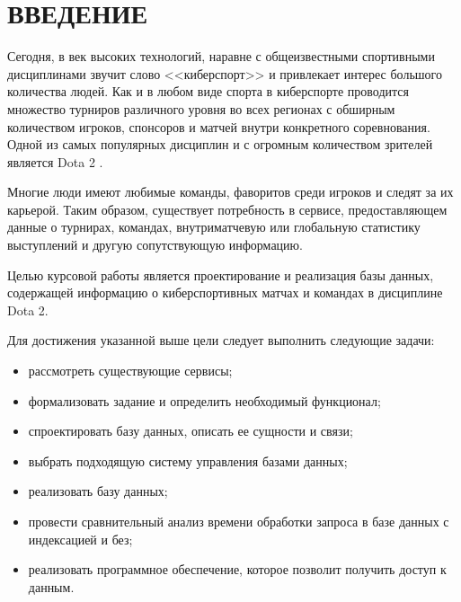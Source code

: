 \chapter*{ВВЕДЕНИЕ}

Сегодня, в век высоких технологий, наравне с общеизвестными спортивными дисциплинами звучит слово <<киберспорт>> и привлекает интерес большого количества людей. Как и в любом виде спорта в киберспорте проводится множество турниров различного уровня во всех регионах с обширным количеством игроков, спонсоров и матчей внутри конкретного соревнования. Одной из самых популярных дисциплин и с огромным количеством зрителей является Dota 2 \cite{twitchtracker}.

Многие люди имеют любимые команды, фаворитов среди игроков и следят за их карьерой. Таким образом, существует потребность в сервисе, предоставляющем данные о турнирах, командах, внутриматчевую или глобальную статистику выступлений и другую сопутствующую информацию.

Целью курсовой работы является проектирование и реализация базы данных, содержащей информацию о киберспортивных матчах и командах в дисциплине Dota 2.

Для достижения указанной выше цели следует выполнить следующие задачи:
	\begin{itemize}
		\item рассмотреть существующие сервисы;
		\item формализовать задание и определить необходимый функционал;
  	\item спроектировать базу данных, описать ее сущности и связи;
		\item выбрать подходящую систему управления базами данных;
        \item реализовать базу данных;
        \item провести сравнительный анализ времени обработки запроса в базе данных с индексацией и без;
		\item реализовать программное обеспечение, которое позволит получить доступ к данным.
	\end{itemize}
